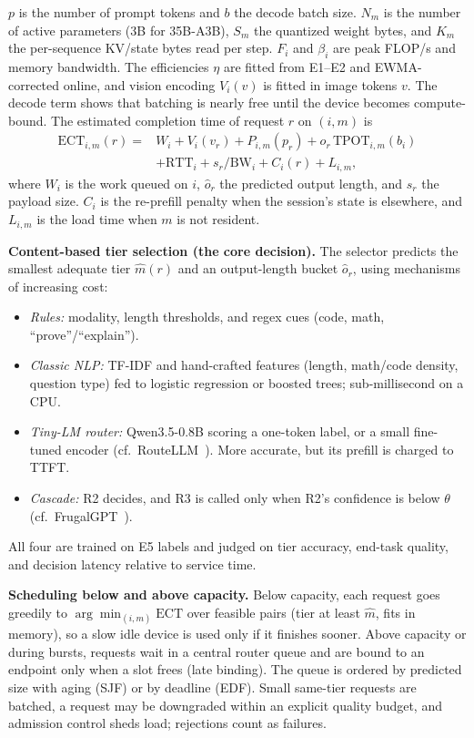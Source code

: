\documentclass[10pt,twocolumn,letterpaper]{article}
\newcommand{\para}[1]{\textbf{#1}\hspace{0.4em}}
\begin{document}
$p$ is the number of prompt tokens and $b$ the decode batch size. $N_m$ is the
number of active parameters (3B for 35B-A3B), $S_m$ the quantized weight bytes,
and $K_m$ the per-sequence KV/state bytes read per step. $F_i$ and $\beta_i$
are peak FLOP/s and memory bandwidth. The efficiencies $\eta$ are fitted from
E1--E2 and EWMA-corrected online, and vision encoding $V_i(v)$ is fitted in
image tokens $v$. The decode term shows that batching is nearly free until the
device becomes compute-bound. The estimated completion time of request $r$ on
$(i,m)$ is
\begin{equation}
\begin{aligned}
\mathrm{ECT}_{i,m}(r) ={}& W_i + V_i(v_r) + P_{i,m}(p_r) + \hat{o}_r\,\mathrm{TPOT}_{i,m}(b_i)\\
&+ \mathrm{RTT}_i + s_r/\mathrm{BW}_i + C_i(r) + L_{i,m},
\end{aligned}
\end{equation}
where $W_i$ is the work queued on $i$, $\hat{o}_r$ the predicted output length,
and $s_r$ the payload size. $C_i$ is the re-prefill penalty when the session's
state is elsewhere, and $L_{i,m}$ is the load time when $m$ is not resident.

\para{Content-based tier selection (the core decision).} The selector predicts
the smallest adequate tier $\hat m(r)$ and an output-length bucket $\hat o_r$,
using mechanisms of increasing cost:
\begin{itemize}
\item[\textbf{R1}] \emph{Rules:} modality, length thresholds, and regex cues
(code, math, ``prove''/``explain'').
\item[\textbf{R2}] \emph{Classic NLP:} TF-IDF and hand-crafted features
(length, math/code density, question type) fed to logistic regression or
boosted trees; sub-millisecond on a CPU.
\item[\textbf{R3}] \emph{Tiny-LM router:} Qwen3.5-0.8B scoring a one-token
label, or a small fine-tuned encoder (cf.\ RouteLLM~\cite{routellm}). More
accurate, but its prefill is charged to TTFT.
\item[\textbf{R4}] \emph{Cascade:} R2 decides, and R3 is called only when R2's
confidence is below $\theta$ (cf.\ FrugalGPT~\cite{frugalgpt}).
\end{itemize}
All four are trained on E5 labels and judged on tier accuracy, end-task
quality, and decision latency relative to service time.

\para{Scheduling below and above capacity.} Below capacity, each request goes
greedily to $\arg\min_{(i,m)}\mathrm{ECT}$ over feasible pairs (tier at least
$\hat m$, fits in memory), so a slow idle device is used only if it finishes
sooner. Above capacity or during bursts, requests wait in a central router
queue and are bound to an endpoint only when a slot frees (late binding). The
queue is ordered by predicted size with aging (SJF) or by deadline (EDF).
Small same-tier requests are batched, a request may be downgraded within an
explicit quality budget, and admission control sheds load; rejections count
as failures.
\end{document}
